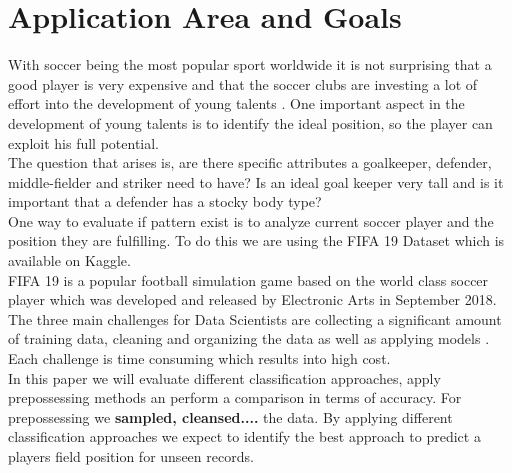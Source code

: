 \section{Application Area and Goals}
With soccer being the most popular sport worldwide it is not surprising that a good player is very expensive and that the soccer clubs are investing a lot of effort into the development of young talents \cite{ref_Transfermarkt}. One important aspect in the development of young talents is to identify the ideal position, so the player can exploit his full potential.\\
The question that arises is, are there specific attributes a goalkeeper, defender, middle-fielder and striker need to have? Is an ideal goal keeper very tall and is it important that a defender has a stocky body type?\\
One way to evaluate if pattern exist is to analyze current soccer player and the position they are fulfilling. To do this we are using the FIFA 19 Dataset which is available on Kaggle.\\
FIFA 19 is a popular football simulation game based on the world class soccer player which was developed and released by Electronic Arts in September 2018. 
The three main challenges for Data Scientists are collecting a significant amount of training data, cleaning and organizing the data as well as applying models  \cite{ref_Crowdflower}. Each challenge is time consuming which results into high cost.\\
In this paper we will evaluate different classification approaches, apply prepossessing methods an perform a comparison in terms of accuracy. For prepossessing we \textbf{sampled, cleansed....} the data.
By applying different classification approaches we expect to identify the best approach to predict a players field position for unseen records.

